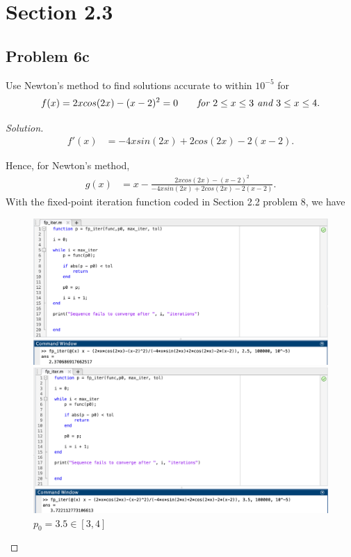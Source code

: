 \documentclass{article}
\begin{document}
\section*{Section 2.3}
\subsection*{Problem 6c}
Use Newton's method to find solutions accurate to within $10^{-5}$ for 
$$f(x) = 2xcos(2x) - (x-2)^2=0\qquad \emph{for } 2\le x\le 3 \emph{ and }3\le x\le 4.$$
\begin{proof}[Solution]
    \begin{align*}
        f'(x) & = -4xsin(2x) + 2cos(2x) - 2(x-2).
    \end{align*}
    
    Hence, for Newton's method, 
    \begin{align*}
        g(x) & = x - \frac{2xcos(2x)-(x-2)^2}{-4xsin(2x)+2cos(2x)-2(x-2)}.
    \end{align*}
    With the fixed-point iteration function coded in Section 2.2 problem 8, we have 
    \begin{figure}[htb]
        \qquad
        \begin{minipage}{.4\textwidth}
            \centering
            \includegraphics[scale=0.2]{2.3.6c1.png}
            \caption{$p_0 = 2.5 \in [2,3]$}
        \end{minipage}    
        \qquad
        \begin{minipage}{.4\textwidth}
            \centering
            \includegraphics[scale=0.2]{2.3.6c2.png}
            \caption{$p_0 =3.5\in[3,4]$}
        \end{minipage}        
    \end{figure} 
\end{proof}
\end{document}
